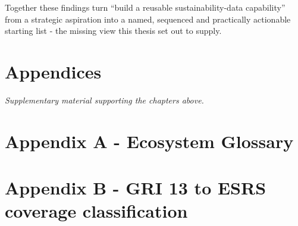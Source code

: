 \documentclass[
]{article}
\begin{document}
Together these findings turn ``build a reusable sustainability-data capability''
from a strategic aspiration into a named, sequenced and practically actionable
starting list - the missing view this thesis set out to supply.



\appendix
\clearpage
\section*{Appendices}
\emph{Supplementary material supporting the chapters above.}

\section*{Appendix A - Ecosystem Glossary}\label{app:glossary}


\section*{Appendix B - GRI 13 to ESRS coverage classification}\label{app:gri13}
\end{document}
